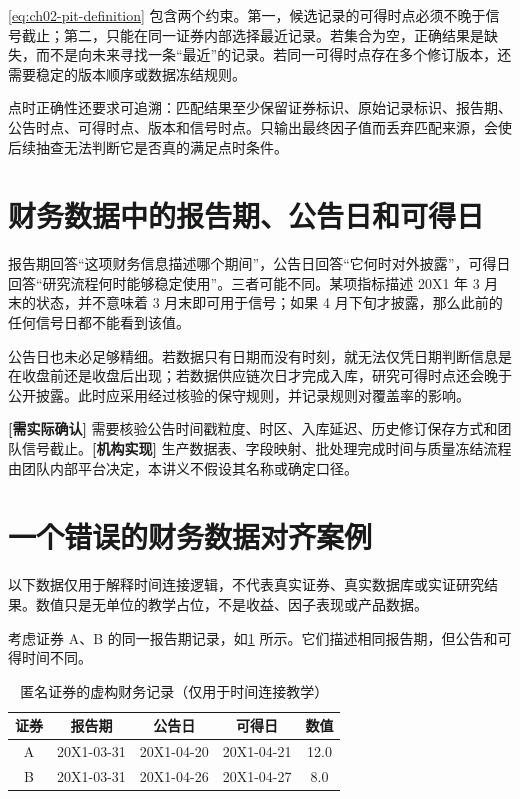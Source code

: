 \cref{eq:ch02-pit-definition} 包含两个约束。第一，候选记录的可得时点必须不晚于信号截止；第二，只能在同一证券内部选择最近记录。若集合为空，正确结果是缺失，而不是向未来寻找一条“最近”的记录。若同一可得时点存在多个修订版本，还需要稳定的版本顺序或数据冻结规则。

点时正确性还要求可追溯：匹配结果至少保留证券标识、原始记录标识、报告期、公告时点、可得时点、版本和信号时点。只输出最终因子值而丢弃匹配来源，会使后续抽查无法判断它是否真的满足点时条件。

\section{财务数据中的报告期、公告日和可得日}

报告期回答“这项财务信息描述哪个期间”，公告日回答“它何时对外披露”，可得日回答“研究流程何时能够稳定使用”。三者可能不同。某项指标描述 20X1 年 3 月末的状态，并不意味着 3 月末即可用于信号；如果 4 月下旬才披露，那么此前的任何信号日都不能看到该值。

公告日也未必足够精细。若数据只有日期而没有时刻，就无法仅凭日期判断信息是在收盘前还是收盘后出现；若数据供应链次日才完成入库，研究可得时点还会晚于公开披露。此时应采用经过核验的保守规则，并记录规则对覆盖率的影响。

\begin{confirmbox}
\textbf{[需实际确认]} 需要核验公告时间戳粒度、时区、入库延迟、历史修订保存方式和团队信号截止。\textbf{[机构实现]} 生产数据表、字段映射、批处理完成时间与质量冻结流程由团队内部平台决定，本讲义不假设其名称或确定口径。
\end{confirmbox}

\section{一个错误的财务数据对齐案例}

\begin{casebox}
以下数据仅用于解释时间连接逻辑，不代表真实证券、真实数据库或实证研究结果。数值只是无单位的教学占位，不是收益、因子表现或产品数据。
\end{casebox}

考虑证券 A、B 的同一报告期记录，如\cref{tab:ch02-toy-financial-records} 所示。它们描述相同报告期，但公告和可得时间不同。

\begin{table}[htbp]
  \centering
  \small
  \caption{匿名证券的虚构财务记录（仅用于时间连接教学）}
  \label{tab:ch02-toy-financial-records}
  \begin{tabular}{@{}ccccc@{}}
    \toprule
    证券 & 报告期 & 公告日 & 可得日 & 数值 \\
    \midrule
    A & 20X1-03-31 & 20X1-04-20 & 20X1-04-21 & 12.0 \\
    B & 20X1-03-31 & 20X1-04-26 & 20X1-04-27 & 8.0 \\
    \bottomrule
  \end{tabular}
\end{table}


